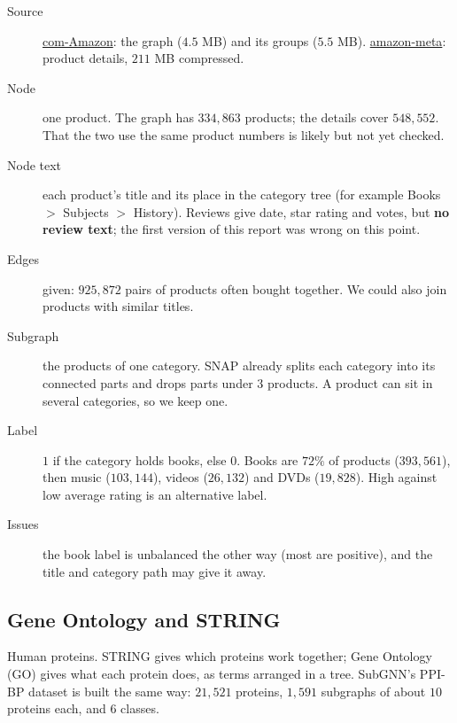 \documentclass[11pt]{article}
\begin{document}
\begin{description}
\item[Source] \href{https://snap.stanford.edu/data/com-Amazon.html}{com-Amazon}: the graph
($4.5$ MB) and its groups ($5.5$ MB).
\href{https://snap.stanford.edu/data/amazon-meta.html}{amazon-meta}: product details,
$211$ MB compressed.
\item[Node] one product. The graph has $334{,}863$ products; the details cover $548{,}552$. That
the two use the same product numbers is likely but not yet checked.
\item[Node text] each product's title and its place in the category tree (for example
Books $>$ Subjects $>$ History). Reviews give date, star rating and votes, but \textbf{no review
text}; the first version of this report was wrong on this point.
\item[Edges] given: $925{,}872$ pairs of products often bought together. We could also join
products with similar titles.
\item[Subgraph] the products of one category. SNAP already splits each category into its
connected parts and drops parts under $3$ products. A product can sit in several categories, so
we keep one.
\item[Label] $1$ if the category holds books, else $0$. Books are $72\%$ of products
($393{,}561$), then music ($103{,}144$), videos ($26{,}132$) and DVDs ($19{,}828$). High against
low average rating is an alternative label.
\item[Issues] the book label is unbalanced the other way (most are positive), and the title and
category path may give it away.
\end{description}

\subsection*{Gene Ontology and STRING}

Human proteins. STRING gives which proteins work together; Gene Ontology (GO) gives what each
protein does, as terms arranged in a tree. SubGNN's PPI-BP dataset is built the same way:
$21{,}521$ proteins, $1{,}591$ subgraphs of about $10$ proteins each, and $6$ classes.
\end{document}
